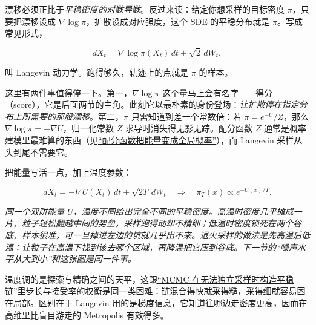 漂移必须正比于\emph{平稳密度的对数导数}。反过来读：给定你想采样的目标密度 \(\pi\)，只要把漂移设成 \(\nabla\log\pi\)，扩散设成对应强度，这个 SDE 的平稳分布就是 \(\pi\)。写成常见形式，

\[
dX_t=\nabla\log\pi(X_t)\,dt+\sqrt{2}\,dW_t,
\]

叫 Langevin 动力学。跑得够久，轨迹上的点就是 \(\pi\) 的样本。

这里有两件事值得停一下。第一，\(\nabla\log\pi\) 这个量马上会有名字——得分（score），它是后面两节的主角。此刻它以最朴素的身份登场：\emph{让扩散停在指定分布上所需要的那股漂移}。第二，\(\pi\) 只需知道到差一个常数倍：若 \(\pi=e^{-U}/Z\)，那么 \(\nabla\log\pi=-\nabla U\)，归一化常数 \(Z\) 求导时消失得无影无踪。配分函数 \(Z\) 通常是概率建模里最难算的东西（见\hyperref[sec:13-Machine-Learning/08-Sampling-and-Inference/06]{``配分函数把能量变成全局概率''}），而 Langevin 采样从头到尾不需要它。

把能量写活一点，加上温度参数：

\[
dX_t=-\nabla U(X_t)\,dt+\sqrt{2T}\,dW_t
\quad\Longrightarrow\quad
\pi_T(x)\propto e^{-U(x)/T}.
\]

\begin{center}

\emph{同一个双阱能量 \(U\)，温度不同给出完全不同的平稳密度。高温时密度几乎摊成一片，粒子轻松翻越中间的势垒，采样跑得动却不精细；低温时密度锁死在两个谷底，样本很准，可一旦掉进左边的坑就几乎出不来。退火采样的做法是先高温后低温：让粒子在高温下找到该去哪个区域，再降温把它压到谷底。下一节的``噪声水平从大到小''和这张图是同一件事。}
\end{center}

温度调的是探索与精确之间的天平，这跟\hyperref[sec:13-Machine-Learning/08-Sampling-and-Inference/02]{``MCMC 在无法独立采样时构造平稳链''}里步长与接受率的权衡是同一类困难：链混合得快就采得糙，采得细就容易困在局部。区别在于 Langevin 用的是梯度信息，它知道往哪边走密度更高，因而在高维里比盲目游走的 Metropolis 有效得多。

